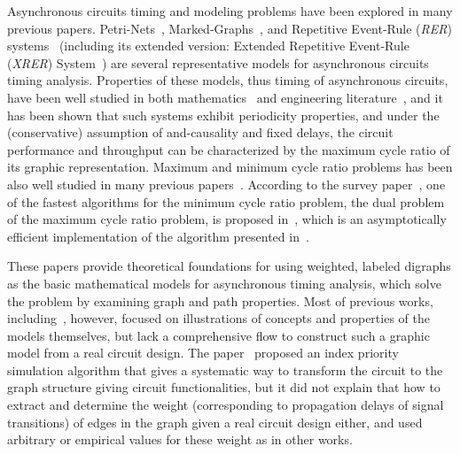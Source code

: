 \documentclass[sigconf, 10pt, twocolumn]{acmart}
\begin{document}
Asynchronous circuits timing and modeling problems have been explored in many previous papers. Petri-Nets~\cite{Murata:Petri}, Marked-Graphs~\cite{Commoner:Marked}, and Repetitive Event-Rule ({\it RER\/}) systems~\cite{Burns:Peformance} (including its extended version: Extended Repetitive Event-Rule ({\it XRER\/}) System~\cite{Lee:Analysis}) are several representative models for asynchronous circuits timing analysis. Properties of these models, thus timing of asynchronous circuits, have been well studied in both mathematics~\cite{Gunawardena:Timing,Gunawardena:Cycle,Gaubert:Rational,Mark:Tr,Bern:Ne,Ser:CSR,Gle:Weak} and engineering literature~\cite{Burns:Peformance,Hulgaard:Report,Lee:Analysis,McGee:An,Hua:Exact}, and it has been shown that such systems exhibit periodicity properties, and under the (conservative) assumption of and-causality and fixed delays, the circuit performance and throughput can be characterized by the maximum cycle ratio of its graphic representation. Maximum and minimum cycle ratio problems has been also well studied in many previous papers~\cite{How:Dynamic,Law:Combinatorial,Karp:Parametric,Burns:Peformance,Neal:Faster}. According to the survey paper~\cite{Dasdan:Experimental}, one of the fastest algorithms for the minimum cycle ratio problem, the dual problem of the maximum cycle ratio problem, is proposed in~\cite{Neal:Faster}, which is an asymptotically efficient implementation of the algorithm presented in~\cite{Karp:Parametric}.

These papers provide theoretical foundations for using weighted, labeled digraphs as the basic mathematical models for asynchronous timing analysis, which solve the problem by examining graph and path properties. Most of previous works, including~\cite{Burns:Peformance,Hulgaard:Report,Lee:Analysis,McGee:An,Hua:Exact}, however, focused on illustrations of concepts and properties of the models themselves, but lack a comprehensive flow to construct such a graphic model from a real circuit design. The paper~\cite{Lee:Analysis} proposed an index priority simulation algorithm that gives a systematic way to transform the circuit to the graph structure giving circuit functionalities, but it did not explain that how to extract and determine the weight (corresponding to propagation delays of signal transitions) of edges in the graph given a real circuit design either, and used arbitrary or empirical values for these weight as in other works.
\end{document}
